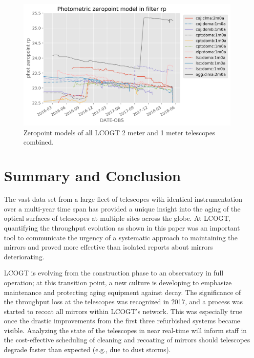 \documentclass[]{spie}
\begin{document}
\begin{figure}
\includegraphics[width=\textwidth]{images/allmodels__2m0a_1m0a__rp.png}
\caption{\label{fig_alltelescopes} Zeropoint models of all LCOGT 2 meter and 1 meter telescopes combined. }
\end{figure}






\section{Summary and Conclusion}

The vast data set from a large fleet of telescopes with identical instrumentation over a multi-year
time span has provided a unique insight into the aging of the optical surfaces of telescopes at
multiple sites across the globe. At LCOGT, quantifying the throughput evolution as shown in this
paper was an important tool to communicate the urgency of a systematic approach to maintaining the
mirrors and proved more effective than isolated reports about mirrors deteriorating.

LCOGT is evolving from the construction phase to an observatory in full operation; at this
transition point, a new culture is developing to emphasize maintenance and protecting aging equipment
against decay. The significance of the throughput loss at the telescopes was recognized in 2017, and
a process was started to recoat all mirrors within LCOGT's network.  This was especially true once
the drastic improvements from the first three refurbished systems became visible.  Analyzing the
state of the telescopes in near real-time will inform staff in the cost-effective scheduling of
cleaning and recoating of mirrors should telescopes degrade faster than expected (e.g., due to dust
storms).
\end{document}
